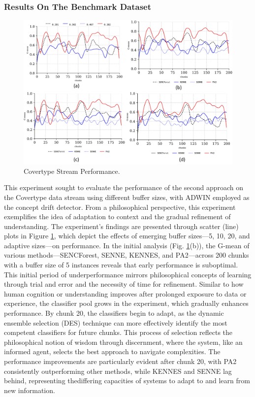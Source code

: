 \subsubsection{Results On The Benchmark Dataset}
\label{sec:covertype}
\begin{figure}[H]
	\centering
	\includegraphics[width=1\linewidth]{5_Emerging/images/res1.png}
	\caption{Covertype Stream Performance.}

	\label{fig:res1}
\end{figure}
This experiment sought to evaluate the performance of the second approach on the Covertype data stream using different buffer sizes, with ADWIN employed as the concept drift detector. From a philosophical perspective, this experiment exemplifies the idea of adaptation to context and the gradual refinement of understanding. The experiment's findings are presented through scatter (line) plots in Figure \ref{fig:res1}, which depict the effects of emerging buffer sizes—5, 10, 20, and adaptive sizes—on performance. In the initial analysis (Fig. \ref{fig:res1}(b)), the G-mean of various methods—SENCForest, SENNE, KENNES, and PA2—across 200 chunks with a buffer size of 5 instances reveals that early performance is suboptimal. This initial period of underperformance mirrors philosophical concepts of learning through trial and error and the necessity of time for refinement. Similar to how human cognition or understanding improves after prolonged exposure to data or experience, the classifier pool grows in the experiment, which gradually enhances performance.  By chunk 20, the classifiers begin to adapt, as the dynamic ensemble selection (DES) technique can more effectively identify the most competent classifiers for future chunks. This process of selection reflects the philosophical notion of wisdom through discernment, where the system, like an informed agent, selects the best approach to navigate complexities. The performance improvements are particularly evident after chunk 20, with PA2 consistently outperforming other methods, while KENNES and SENNE lag behind, representing thediffering capacities of systems to adapt to and learn from new information.

